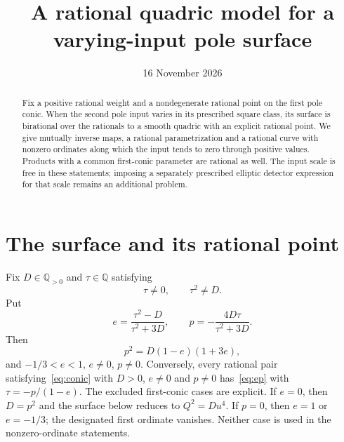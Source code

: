 \documentclass[11pt,a4paper]{article}
\title{A rational quadric model for a varying-input pole surface}
\author{}\date{16 November 2026}
\theoremstyle{remark}\newtheorem{remark}[theorem]{Remark}
\newcommand{\Q}{\mathbb Q}\newcommand{\PP}{\mathbb P}
\begin{document}
\maketitle
\begin{abstract}
Fix a positive rational weight and a nondegenerate rational point on the
first pole conic. When the second pole input varies in its prescribed
square class, its surface is birational over the rationals to a smooth
quadric with an explicit rational point. We give mutually inverse maps,
a rational parametrization and a rational curve with nonzero ordinates
along which the input tends to zero through positive values. Products
with a common first-conic parameter are rational as well. The input scale
is free in these statements; imposing a separately prescribed elliptic
detector expression for that scale remains an additional problem.
\end{abstract}

\section{The surface and its rational point}
Fix $D\in\Q_{>0}$ and $\tau\in\Q$ satisfying
\begin{equation}\label{eq:hypotheses}
                       \tau\ne0,\qquad \tau^2\ne D.
\end{equation}
Put
\begin{equation}\label{eq:ep}
 e=\frac{\tau^2-D}{\tau^2+3D},\qquad
 p=-\frac{4D\tau}{\tau^2+3D}.
\end{equation}
Then
\begin{equation}\label{eq:conic}
                   p^2=D(1-e)(1+3e),
\end{equation}
and $-1/3<e<1$, $e\ne0$, $p\ne0$. Conversely, every rational
pair satisfying~\eqref{eq:conic} with $D>0$, $e\ne0$ and $p\ne0$
has~\eqref{eq:ep} with $\tau=-p/(1-e)$.
The excluded first-conic cases are explicit. If $e=0$, then $D=p^2$
and the surface below reduces to $Q^2=Du^4$. If $p=0$, then
$e=1$ or $e=-1/3$; the designated first ordinate vanishes. Neither
case is used in the nonzero-ordinate statements.
\end{document}
